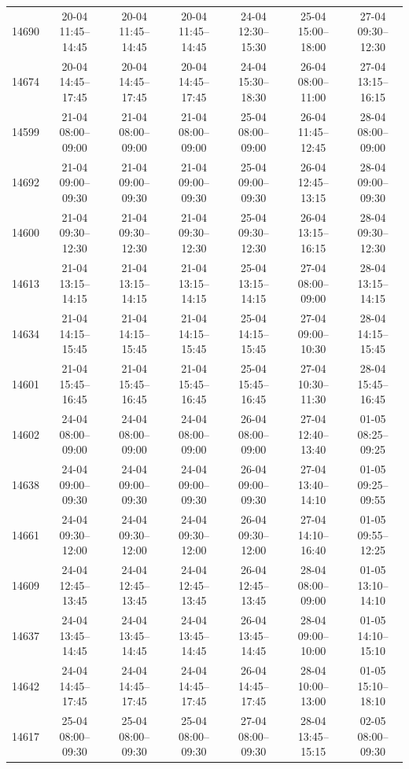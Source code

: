 \begin{table}[htbp]
\begin{tabular}{|r|c|c|c|c|c|c|}
14690 & 20-04 11:45--14:45 & 20-04 11:45--14:45 & 20-04 11:45--14:45 & 24-04 12:30--15:30 & 25-04 15:00--18:00 & 27-04 09:30--12:30 \\ 
14674 & 20-04 14:45--17:45 & 20-04 14:45--17:45 & 20-04 14:45--17:45 & 24-04 15:30--18:30 & 26-04 08:00--11:00 & 27-04 13:15--16:15 \\ 
14599 & 21-04 08:00--09:00 & 21-04 08:00--09:00 & 21-04 08:00--09:00 & 25-04 08:00--09:00 & 26-04 11:45--12:45 & 28-04 08:00--09:00 \\ 
14692 & 21-04 09:00--09:30 & 21-04 09:00--09:30 & 21-04 09:00--09:30 & 25-04 09:00--09:30 & 26-04 12:45--13:15 & 28-04 09:00--09:30 \\ 
14600 & 21-04 09:30--12:30 & 21-04 09:30--12:30 & 21-04 09:30--12:30 & 25-04 09:30--12:30 & 26-04 13:15--16:15 & 28-04 09:30--12:30 \\ 
14613 & 21-04 13:15--14:15 & 21-04 13:15--14:15 & 21-04 13:15--14:15 & 25-04 13:15--14:15 & 27-04 08:00--09:00 & 28-04 13:15--14:15 \\ 
14634 & 21-04 14:15--15:45 & 21-04 14:15--15:45 & 21-04 14:15--15:45 & 25-04 14:15--15:45 & 27-04 09:00--10:30 & 28-04 14:15--15:45 \\ 
14601 & 21-04 15:45--16:45 & 21-04 15:45--16:45 & 21-04 15:45--16:45 & 25-04 15:45--16:45 & 27-04 10:30--11:30 & 28-04 15:45--16:45 \\ 
14602 & 24-04 08:00--09:00 & 24-04 08:00--09:00 & 24-04 08:00--09:00 & 26-04 08:00--09:00 & 27-04 12:40--13:40 & 01-05 08:25--09:25 \\ 
14638 & 24-04 09:00--09:30 & 24-04 09:00--09:30 & 24-04 09:00--09:30 & 26-04 09:00--09:30 & 27-04 13:40--14:10 & 01-05 09:25--09:55 \\ 
14661 & 24-04 09:30--12:00 & 24-04 09:30--12:00 & 24-04 09:30--12:00 & 26-04 09:30--12:00 & 27-04 14:10--16:40 & 01-05 09:55--12:25 \\ 
14609 & 24-04 12:45--13:45 & 24-04 12:45--13:45 & 24-04 12:45--13:45 & 26-04 12:45--13:45 & 28-04 08:00--09:00 & 01-05 13:10--14:10 \\ 
14637 & 24-04 13:45--14:45 & 24-04 13:45--14:45 & 24-04 13:45--14:45 & 26-04 13:45--14:45 & 28-04 09:00--10:00 & 01-05 14:10--15:10 \\ 
14642 & 24-04 14:45--17:45 & 24-04 14:45--17:45 & 24-04 14:45--17:45 & 26-04 14:45--17:45 & 28-04 10:00--13:00 & 01-05 15:10--18:10 \\ 
14617 & 25-04 08:00--09:30 & 25-04 08:00--09:30 & 25-04 08:00--09:30 & 27-04 08:00--09:30 & 28-04 13:45--15:15 & 02-05 08:00--09:30 \\ 

\end{tabular}
\end{table}
